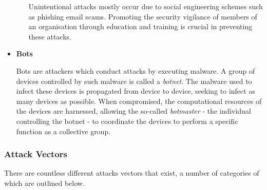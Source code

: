 \begin{itemize}
\begin{enumerate}
            Unintentional attacks mostly occur due to social engineering schemes such as phishing email scams. Promoting the security vigilance of members of an organisation through education and training is crucial in preventing these attacks.
            \end{enumerate}
    
    \item \textbf{Bots}
    
    Bots are attackers which conduct attacks by executing malware. A group of devices controlled by such malware is called a \textit{botnet}. The malware used to infect these devices is propagated from device to device, seeking to infect as many devices as possible. When compromised, the computational resources of the devices are harnessed, allowing the so-called \textit{botmaster} - the individual controlling the botnet - to coordinate the devices to perform a specific function as a collective group.
 \end{itemize}
 
\subsubsection{Attack Vectors}
There are countless different attacks vectors that exist, a number of categories of which are outlined below.

